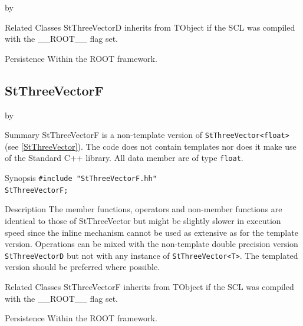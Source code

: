 \documentclass[twoside]{article}
\newcommand{\name}[1]{\textsf{#1}}%
\newcommand{\entrylabel}[1]{\mbox{\textbf{{#1}}}\hfil}%
\newenvironment{entry}
{\begin{list}{}%
    {\renewcommand{\makelabel}{\entrylabel}%
     \setlength{\labelwidth}{90pt}%
     \setlength{\leftmargin}{\labelwidth}
     \advance\leftmargin by \labelsep%
      }%
    }%
  {\end{list}}
\newcommand{\Entrylabel}[1]%
{\raisebox{0pt}[1ex][0pt]{\makebox[\labelwidth][l]%
    {\parbox[t]{\labelwidth}{\hspace{0pt}\textbf{{#1}}}}}}
\newenvironment{Entry}%
{\renewcommand{\entrylabel}{\Entrylabel}\begin{entry}}%
  {\end{entry}}
\begin{document}
\begin{description}
\begin{Entry}
\item[Related Classes]
    StThreeVectorD inherits from TObject 
    if the SCL was compiled with the \name{\_\_ROOT\_\_} flag set.

\item[Persistence]
    Within the ROOT framework.

\end{Entry}

%
%
\subsection{StThreeVectorF }
\begin{Entry}
\item[Summary]
    StThreeVectorF is a non-template version of \verb+StThreeVector<float>+
    (see \ref{StThreeVector}). The code does not contain templates nor
    does it make use of the Standard C++ library. All data member are of
    type \texttt{float}.
    
\item[Synopsis]
    \verb+#include "StThreeVectorF.hh"+ \\
    \verb+StThreeVectorF;+
    
\item[Description]       
    The member functions, operators and non-member functions are identical
    to those of StThreeVector but might be slightly slower in execution speed
    since the inline mechanism cannot be used as extensive as for the template
    version. Operations can be mixed with the non-template double precision version
    \texttt{StThreeVectorD} but not with any instance of \verb+StThreeVector<T>+.
    The templated version should be preferred where possible.

\item[Related Classes]
    StThreeVectorF inherits from TObject 
    if the SCL was compiled with the \name{\_\_ROOT\_\_} flag set.

\item[Persistence]
    Within the ROOT framework.

\end{Entry}

\clearpage

%
%

\end{description}
\end{document}
